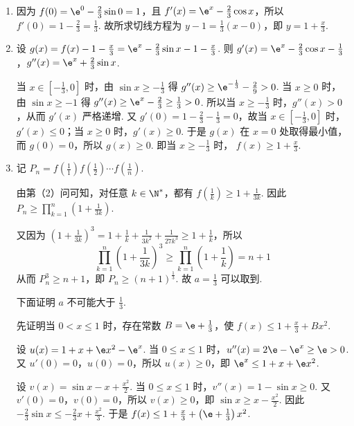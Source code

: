 \begin{solution}
\begin{enumerate}
\item 因为 \(f(0)=\e^0-\frac{2}{3}\sin 0=1\)，且 \(f'(x)=\e^x-\frac{2}{3}\cos x\)，所以 \(f'(0)=1-\frac{2}{3}=\frac{1}{3}\). 故所求切线方程为 \(y-1=\frac{1}{3}\left( x-0 \right)\)，即 \(y=1+\frac{x}{3}\).

\item 设 \(g(x)=f(x)-1-\frac{x}{3}=\e^x-\frac{2}{3}\sin x-1-\frac{x}{3}\). 则 \(g'(x)=\e^x-\frac{2}{3}\cos x-\frac{1}{3}\)，\(g''(x)=\e^x+\frac{2}{3}\sin x\).

当 \(x\in \left[ -\frac{1}{3},0 \right]\) 时，由 \(\sin x\ge -\frac{1}{3}\) 得 \(g''(x)\ge \e^{-\frac{1}{3}}-\frac{2}{9}>0\). 当 \(x\ge 0\) 时，由 \(\sin x\ge -1\) 得 \(g''(x)\ge \e^x-\frac{2}{3}\ge \frac{1}{3}>0\). 所以当 \(x\ge -\frac{1}{3}\) 时，\(g''(x)>0\)，从而 \(g'(x)\) 严格递增.
又 \(g'(0)=1-\frac{2}{3}-\frac{1}{3}=0\)，故当 \(x\in \left[ -\frac{1}{3},0 \right]\) 时，\(g'(x)\le 0\)；当 \(x\ge 0\) 时，\(g'(x)\ge 0\). 于是 \(g(x)\) 在 \(x=0\) 处取得最小值，而 \(g(0)=0\)，所以 \(g(x)\ge 0\). 即当 \(x\ge -\frac{1}{3}\) 时，
\(f(x)\ge 1+\frac{x}{3}\).

\item 记 \(P_n=f\left( \frac{1}{1} \right)f\left( \frac{1}{2} \right)\cdots f\left( \frac{1}{n} \right)\).

由第（2）问可知，对任意 \(k\in \N^*\)，都有 \(f\left( \frac{1}{k} \right)\ge 1+\frac{1}{3k}\). 因此 \(P_n\ge \prod_{k=1}^{n}\left( 1+\frac{1}{3k} \right)\).

又因为 \(\left( 1+\frac{1}{3k} \right)^3=1+\frac{1}{k}+\frac{1}{3k^2}+\frac{1}{27k^3}\ge 1+\frac{1}{k}\)，所以
\[
\prod_{k=1}^{n}\left( 1+\frac{1}{3k} \right)^3\ge \prod_{k=1}^{n}\left( 1+\frac{1}{k} \right)=n+1
\]
从而 \(P_n^3\ge n+1\)，即 \(P_n\ge \left( n+1 \right)^{\frac{1}{3}}\). 故 \(a=\frac{1}{3}\) 可以取到.

下面证明 \(a\) 不可能大于 \(\frac{1}{3}\).

先证明当 \(0<x\le 1\) 时，存在常数 \(B=\e+\frac{1}{3}\)，使 \(f(x)\le 1+\frac{x}{3}+Bx^2\).

设 \(u(x)=1+x+\e x^2-\e^x\). 当 \(0\le x\le 1\) 时，\(u''(x)=2\e-\e^x\ge \e>0\). 又 \(u'(0)=0\)，\(u(0)=0\)，所以 \(u(x)\ge 0\)，即 \(\e^x\le 1+x+\e x^2\).

设 \(v(x)=\sin x-x+\frac{x^2}{2}\). 当 \(0\le x\le 1\) 时，\(v''(x)=1-\sin x\ge 0\). 又 \(v'(0)=0\)，\(v(0)=0\)，所以 \(v(x)\ge 0\)，即 \(\sin x\ge x-\frac{x^2}{2}\). 因此 \(-\frac{2}{3}\sin x\le -\frac{2}{3}x+\frac{x^2}{3}\). 于是 \(f(x)\le 1+\frac{x}{3}+\left( \e+\frac{1}{3} \right)x^2\).


\end{enumerate}
\end{solution}
